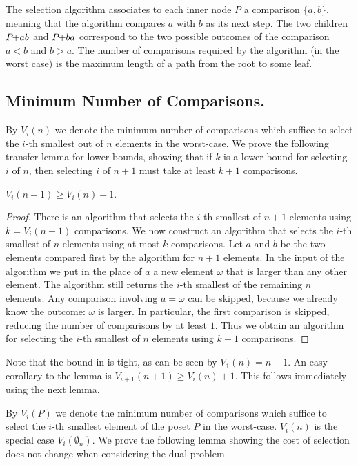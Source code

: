 \documentclass[twoside,leqno,twocolumn]{article}
\newcommand{\pchild}[3]{{#1}\kern-1pt{+}{#2}{#3}}
\begin{document}
The selection algorithm associates to each inner node $P$ a comparison $\{a, b\}$, meaning that the algorithm compares $a$ with $b$ as its next step.
The two children $\pchild{P}{a}{b}$ and $\pchild{P}{b}{a}$ correspond to the two possible outcomes of the comparison $a < b$ and $b > a$.
The number of comparisons required by the algorithm (in the worst case) is the maximum length of a path from the root to some leaf.


\subsection{Minimum Number of Comparisons.}

By $V_i(n)$ we denote the minimum number of comparisons which suffice to select the $i$-th smallest out of $n$ elements in the worst-case.
We prove the following transfer lemma for lower bounds, showing that if $k$ is a lower bound for selecting $i$ of $n$, then selecting $i$ of $n + 1$ must take at least $k + 1$ comparisons.

\begin{lemma} \label{lemma:previous_next_poset}
  $V_i(n + 1) \ge V_i(n) + 1$.
\end{lemma}

\begin{proof}
  There is an algorithm that selects the $i$-th smallest of $n + 1$ elements using $k = V_i(n + 1)$ comparisons.
  We now construct an algorithm that selects the $i$-th smallest of $n$ elements using at most $k$ comparisons.
  Let $a$ and $b$ be the two elements compared first by the algorithm for $n + 1$ elements.
  In the input of the algorithm we put in the place of $a$ a new element $\omega$ that is larger than any other element.
  The algorithm still returns the $i$-th smallest of the remaining $n$ elements.
  Any comparison involving $a = \omega$ can be skipped, because we already know the outcome: $\omega$ is larger.
  In particular, the first comparison is skipped, reducing the number of comparisons by at least $1$.
  Thus we obtain an algorithm for selecting the $i$-th smallest of $n$ elements using $k - 1$ comparisons.
\end{proof}

Note that the bound in  is tight, as can be seen by $V_1(n) = n - 1$.
An easy corollary to the lemma is $V_{i + 1}(n + 1) \ge V_i(n) + 1$.
This follows immediately using the next lemma.

By $V_i(P)$ we denote the minimum number of comparisons which suffice to select the $i$-th smallest element of the poset $P$ in the worst-case.
$V_i(n)$ is the special case $V_i(\emptyset_n)$.
We prove the following lemma showing the cost of selection does not change when considering the dual problem.
\end{document}
